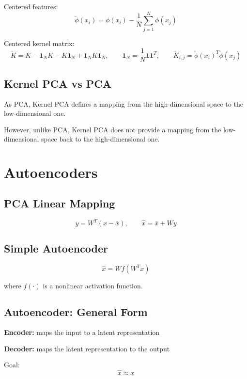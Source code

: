 \documentclass[11pt,a4paper,openany]{book}
\begin{document}
Centered features:
\[
\tilde{\phi}(x_i) = \phi(x_i) - \frac{1}{N}\sum_{j=1}^{N}\phi(x_j)
\]

Centered kernel matrix:
\[
\tilde{K} = K - \mathbf{1}_N K - K\mathbf{1}_N + \mathbf{1}_N K \mathbf{1}_N,
\qquad \mathbf{1}_N = \frac{1}{N}\mathbf{1}\mathbf{1}^T,
\qquad \tilde{K}_{i,j} = \tilde{\phi}(x_i)^T\tilde{\phi}(x_j)
\]

\subsection{Kernel PCA vs PCA}

\begin{propbox}[title=Kernel PCA limitation]
As PCA, Kernel PCA defines a mapping from the high-dimensional space to the low-dimensional one.

However, unlike PCA, Kernel PCA does not provide a mapping from the low-dimensional space back to the high-dimensional one.
\end{propbox}

\section{Autoencoders}

\subsection{PCA Linear Mapping}
\[
y = W^T(x-\bar{x}),
\qquad
\hat{x} = \bar{x} + Wy
\]

\subsection{Simple Autoencoder}

\begin{defnbox}[title=Simple Autoencoder]
\[
\hat{x} = W f(W^T x)
\]

where \(f(\cdot)\) is a nonlinear activation function.

\end{defnbox}

\subsection{Autoencoder: General Form}

\begin{defnbox}[title=Autoencoder]
\textbf{Encoder:} maps the input to a latent representation

\textbf{Decoder:} maps the latent representation to the output

Goal:
\[
\hat{x} \approx x
\]
\end{defnbox}
\end{document}

